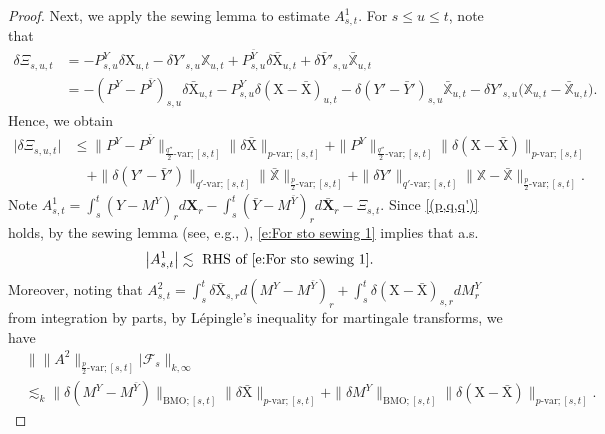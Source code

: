 \documentclass[11pt,reqno]{amsart}
\numberwithin{equation}{section}
\begin{document}
\begin{proof}
Next, we apply the sewing lemma to estimate $A^1_{s,t}$. For $s\le u\le t$, note that 
\begin{equation*}
\begin{aligned}
\delta \Xi_{s,u,t} &= - P^Y_{s,u} \delta\mathrm X_{u,t} - \delta Y'_{s,u}\mathbb X_{u,t} + P^{\bar Y}_{s,u}  \delta\bar{\mathrm X}_{u,t} + \delta \bar Y'_{s,u}\bar{\mathbb X}_{u,t}\\
& = -(P^Y - P^{\bar Y})_{s,u} \delta \bar{\mathrm X}_{u,t} - P^Y_{s,u} \delta(\mathrm X -  \bar{\mathrm X})_{u,t} - \delta (Y' - \bar Y')_{s,u} \bar{\mathbb X}_{u,t} - \delta Y'_{s,u} \big(\mathbb X_{u,t} - \bar{\mathbb X}_{u,t} \big). 
\end{aligned}
\end{equation*}
Hence, we obtain 
\begin{equation}\label{e:For sto sewing 1}
\begin{aligned}
\big| \delta \Xi_{s,u,t} \big| 
&\le \|P^Y - P^{\bar Y}\|_{\frac{q''}{2}\text{-}\mathrm{var};[s,t]}
\|\delta \bar {\mathrm X} \|_{p\text{-}\mathrm{var};[s,t]} + \|P^Y\|_{\frac{q''}{2}\text{-}\mathrm{var};[s,t]}
\|\delta( \mathrm X -\bar{\mathrm X} )\|_{p\text{-}\mathrm{var};[s,t]} \\ 
& \quad + \|\delta(Y' - \bar Y')\|_{q'\text{-}\mathrm{var};[s,t]} \|\bar{\mathbb X}\|_{\frac{p}{2}\text{-}\mathrm{var};[s,t]} + \|\delta Y'\|_{q'\text{-}\mathrm{var};[s,t]} \|\mathbb X - \bar{\mathbb X}\|_{\frac{p}{2}\text{-}\mathrm{var};[s,t]}.
\end{aligned}
\end{equation}
Note $A^1_{s,t} = \int_{s}^{t} (Y - M^Y)_{r }d\mathbf X_{r} - \int_{s}^{t} (\bar Y - M^{\bar Y})_{r} d\bar{\mathbf X}_{r} - \Xi_{s,t}$. Since \ref{(p,q,q')} holds, by the sewing lemma (see, e.g., \cite[Theorem~2.5]{FrizZhang-2018}), \eqref{e:For sto sewing 1} implies that a.s.   
\begin{equation}\label{e:RHS RHS}
\big| A^1_{s,t} \big| \lesssim \text{ RHS of \eqref{e:For sto sewing 1}}.
\end{equation}
Moreover, noting that $A^2_{s,t} = \int_s^t \delta \bar{\mathrm X}_{s,r} d(M^{Y} - M^{\bar Y})_r + \int_s^t \delta (\mathrm X - \bar{\mathrm X})_{s,r} dM^{Y}_r$ from integration by parts, by L\'epingle's inequality for martingale transforms, we have 
\begin{equation}\label{e:esti for A^2}
\begin{aligned}
&\big\| \|A^2\|_{\frac{p}{2}\text{-}\mathrm{var};[s,t]} \big | \mathcal F_s \big\|_{k,\infty} \\
&\lesssim_k \|\delta (M^Y - M^{\bar Y})\|_{\mathrm{BMO};[s,t]} \|\delta \bar{\mathrm X}\|_{p\text{-}\mathrm{var};[s,t]} + \|\delta M^Y\|_{\mathrm{BMO};[s,t]} \|\delta (\mathrm X - \bar{\mathrm X})\|_{p\text{-}\mathrm{var};[s,t]}. 
\end{aligned}
\end{equation}


\end{proof}
\end{document}
